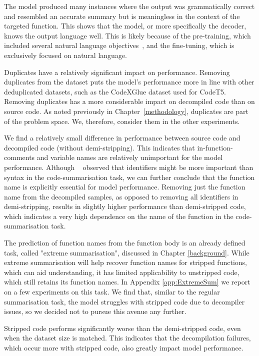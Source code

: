 The model produced many instances where the output was grammatically correct and resembled an accurate summary but is meaningless in the context of the targeted function. This shows that the model, or more specifically the decoder, knows the output language well. This is likely because of the pre-training, which included several natural language objectives~\cite{CodeT5}, and the fine-tuning, which is exclusively focused on natural language.

Duplicates have a relatively significant impact on performance. Removing duplicates from the dataset puts the model's performance more in line with other deduplicated datasets, such as the CodeXGlue dataset used for CodeT5. Removing duplicates has a more considerable impact on decompiled code than on source code. As noted previously in Chapter~\ref{methodology}, duplicates are part of the problem space. We, therefore, consider them in the other experiments.

We find a relatively small difference in performance between source code and decompiled code (without demi-stripping). This indicates that in-function-comments and variable names are relatively unimportant for the model performance. Although ~\citeauthor{PolyglotCodeBERT} observed that identifiers might be more important than syntax in the code-summarisation task, we can further conclude that the function name is explicitly essential for model performance. Removing just the function name from the decompiled samples, as opposed to removing all identifiers in demi-stripping, results in slightly higher performance than demi-stripped code, which indicates a very high dependence on the name of the function in the code-summarisation task. 

The prediction of function names from the function body is an already defined task, called "extreme summarisation", discussed in Chapter \ref{background}. While extreme summarisation will help recover function names for stripped functions, which can aid understanding, it has limited applicability to unstripped code, which still retains its function names. In Appendix \ref{app:ExtremeSum} we report on a few experiments on this task. We find that, similar to the regular summarisation task, the model struggles with stripped code due to decompiler issues, so we decided not to pursue this avenue any further.

Stripped code performs significantly worse than the demi-stripped code, even when the dataset size is matched. This indicates that the decompilation failures, which occur more with stripped code, also greatly impact model performance.

